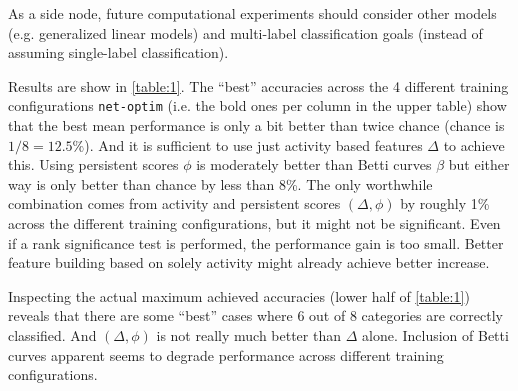 As a side node, future computational experiments should consider other models (e.g. generalized linear models) and multi-label classification goals (instead of assuming single-label classification).



Results are show in \autoref{table:1}. The ``best'' accuracies across the 4 different training configurations \texttt{net-optim} (i.e. the bold ones per column in the upper table) show that the best mean performance is only a bit better than twice chance (chance is $1/8=12.5\%$). And it is sufficient to use just activity based features $\Delta$ to achieve this. Using persistent scores $\phi$ is moderately better than Betti curves $\beta$ but either way is only better than chance by less than 8\%. The only worthwhile combination comes from activity and persistent scores $(\Delta,\phi)$ by roughly 1\% across the different training configurations, but it might not be significant. Even if a rank significance test is performed, the performance gain is too small. Better feature building based on solely activity might already achieve better increase.

Inspecting the actual maximum achieved accuracies (lower half of \autoref{table:1}) reveals that there are some ``best'' cases where 6 out of 8 categories are correctly classified. And $(\Delta,\phi)$ is not really much better than $\Delta$ alone. Inclusion of Betti curves apparent seems to degrade performance across different training configurations.